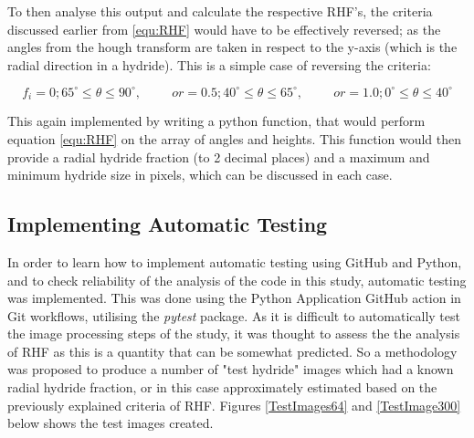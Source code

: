 \documentclass{article}
\begin{document}
    To then analyse this output and calculate the respective RHF's, the criteria discussed earlier from \ref{equ:RHF} would have to be effectively reversed; as the angles from the hough transform are taken in respect to the y-axis (which is the radial direction in a hydride). This is a simple case of reversing the criteria:
    
    \begin{equation}
        f_i = 0; 65^{\circ} \leq \theta \leq 90^{\circ},\hspace{1cm} or = 0.5;  40^{\circ} \leq \theta \leq 65^{\circ}, \hspace{1cm} or = 1.0; 0^{\circ} \leq \theta \leq 40^{\circ}
    \end{equation}
    
    This again implemented by writing a python function, that would perform equation \ref{equ:RHF} on the array of angles and heights. This function would then provide a radial hydride fraction (to 2 decimal places) and a maximum and minimum hydride size in pixels, which can be discussed in each case.
    
\subsection{Implementing Automatic Testing}
    In order to learn how to implement automatic testing using GitHub and Python, and to check reliability of the analysis of the code in this study, automatic testing was implemented. This was done using the Python Application GitHub action in Git workflows, utilising the \textit{pytest} package. As it is difficult to automatically test the image processing steps of the study, it was thought to assess the the analysis of RHF as this is a quantity that can be somewhat predicted. So a methodology was proposed to produce a number of "test hydride" images which had a known radial hydride fraction, or in this case approximately estimated based on the previously explained criteria of RHF. Figures \ref{TestImages64} and \ref{TestImage300} below shows the test images created.
\end{document}

